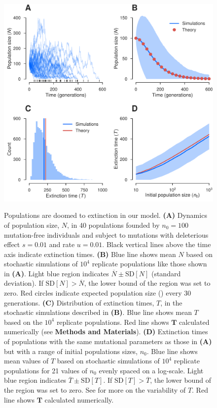 \documentclass[9pt,lineno]{elife}
\begin{document}
\begin{figure}[ht!]
\includegraphics[width=.67\linewidth]{decay.pdf}
\caption{Populations are doomed to extinction in our model.  
%
\textbf{(A)} Dynamics of population size, $N$, in 40 populations founded by $n_0=100$ mutation-free individuals and subject to mutations with deleterious effect $s=0.01$ and rate $u=0.01$.  Black vertical lines above the time axis indicate extinction times.
%
\textbf{(B)} Blue line shows mean $N$ based on stochastic simulations of $10^4$ replicate populations like those shown in \textbf{(A)}.  
Light blue region indicates $\overline{N} \pm \mathrm{SD}[N]$ (standard deviation). If $\mathrm{SD}[N] > \overline{N}$, the lower bound of the region was set to zero.  
Red circles indicate expected population size () every 30 generations.
%
\textbf{(C)} Distribution of extinction times, $T$, in the stochastic simulations described in \textbf{(B)}. 
Blue line shows mean $T$ based on the $10^4$ replicate populations.  
Red line shows $\mathbf{T}$ calculated numerically (see \textbf{Methods and Materials}).  
%
\textbf{(D)} Extinction times of populations with the same mutational parameters as those in \textbf{(A)} but with a range of initial populations sizes, $n_0$.
%
Blue line shows mean values of $T$ based on stochastic simulations of $10^4$ replicate populations for 21 values of $n_0$ evenly spaced on a log-scale.
%
Light blue region indicates $\overline{T} \pm  \mathrm{SD}[T]$. If $\mathrm{SD}[T] > \overline{T}$, the lower bound of the region was set to zero.  See  for more on the variability of $T$.
%
Red line shows $\mathbf{T}$ calculated numerically.}
\label{fig:decay}
\label{figsupp:sf1}
\end{figure}
\end{document}
